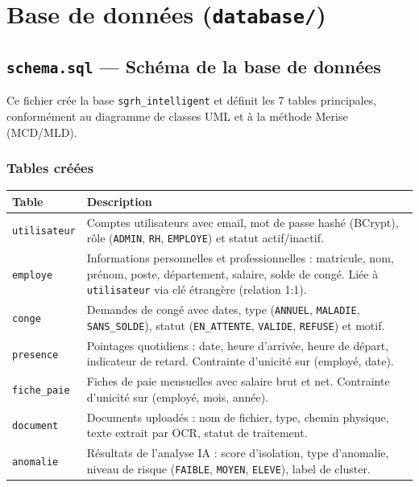 \documentclass[a4paper,12pt]{report}
\begin{document}
\chapter{Base de données (\texttt{database/})}

\section{\texttt{schema.sql} --- Schéma de la base de données}

Ce fichier crée la base \texttt{sgrh\_intelligent} et définit les 7 tables principales, conformément au diagramme de classes UML et à la méthode Merise (MCD/MLD).

\subsection{Tables créées}

\begin{center}
\begin{tabularx}{\textwidth}{|l|X|}
\hline
\textbf{Table} & \textbf{Description} \\
\hline
\texttt{utilisateur} & Comptes utilisateurs avec email, mot de passe hashé (BCrypt), rôle (\texttt{ADMIN}, \texttt{RH}, \texttt{EMPLOYE}) et statut actif/inactif. \\
\hline
\texttt{employe} & Informations personnelles et professionnelles : matricule, nom, prénom, poste, département, salaire, solde de congé. Liée à \texttt{utilisateur} via clé étrangère (relation 1:1). \\
\hline
\texttt{conge} & Demandes de congé avec dates, type (\texttt{ANNUEL}, \texttt{MALADIE}, \texttt{SANS\_SOLDE}), statut (\texttt{EN\_ATTENTE}, \texttt{VALIDE}, \texttt{REFUSE}) et motif. \\
\hline
\texttt{presence} & Pointages quotidiens : date, heure d'arrivée, heure de départ, indicateur de retard. Contrainte d'unicité sur (employé, date). \\
\hline
\texttt{fiche\_paie} & Fiches de paie mensuelles avec salaire brut et net. Contrainte d'unicité sur (employé, mois, année). \\
\hline
\texttt{document} & Documents uploadés : nom de fichier, type, chemin physique, texte extrait par OCR, statut de traitement. \\
\hline
\texttt{anomalie} & Résultats de l'analyse IA : score d'isolation, type d'anomalie, niveau de risque (\texttt{FAIBLE}, \texttt{MOYEN}, \texttt{ELEVE}), label de cluster. \\
\hline
\end{tabularx}
\end{center}
\end{document}
